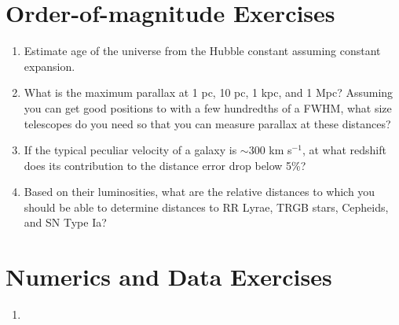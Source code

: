 \section{Order-of-magnitude Exercises}

\begin{enumerate} 
\item Estimate age of the universe from the Hubble constant assuming
    constant expansion.
\item What is the maximum parallax at 1 pc, 10 pc, 1 kpc, and 1 Mpc?
    Assuming you can get good positions to with a few hundredths of a
    FWHM, what size telescopes do you need so that you can measure
    parallax at these distances?
\item If the typical peculiar velocity of a galaxy is $\sim 300$ km
    s$^{-1}$, at what redshift does its contribution to the distance
   error drop below 5\%?
\item Based on their luminosities, what are the relative distances to
   which you should be able to determine distances to RR Lyrae,
   TRGB stars, Cepheids, and SN Type Ia?
\end{enumerate} 

\section{Numerics and Data Exercises}

\begin{enumerate}
\item \citet{clementini18a}
\end{enumerate}


  
